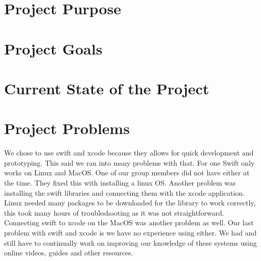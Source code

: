 \documentclass[onecolumn, draftclsnofoot,10pt, compsoc]{IEEEtran}
\def \CapstoneProjectName{ISS Barometer App }
\begin{document}
\begin{titlepage}
\begin{singlespace}
{{            }
            \vspace{20pt}
        }
        \begin{abstract}
        The International Space Station, the conglomerate work of multiple national space associations, including NASA, requires precision devices to monitor the many aspects of space life.
        One very important aspect for the success of life in near vacuum is sustained air pressure inside the modules.
        This air pressure is monitored by mechanical barometers, called Manovacometers, which must be visually monitored, and are no longer available.
        The \CapstoneProjectName seeks to provide a suitable replacement for the current barometer device aboard the International Space Station.
        This document will serve to introduce the \CapstoneProjectName, and will detail the problem, the solution, and the success metrics of the project.
        The sections include the Definition of the Problem, Definition of Project, and the Metrics of Success.
        \end{abstract}
    \end{singlespace}
\end{titlepage}
\newpage
{}
\tableofcontents
\clearpage

\section{Project Purpose}

\section{Project Goals}

\section{Current State of the Project}

\section{Project Problems}
We chose to use swift and xcode because they allows for quick development and prototyping. 
This said we ran into many problems with that. For one Swift only works on Linux and MacOS.
One of our group members did not have either at the time. They fixed this with installing a linux OS. 
Another problem was installing the swift libraries and connecting them with the xcode application.
Linux needed many packages to be downloaded for the library to work correctly, this took many hours of troubleshooting as it was not straightforward.
Connecting swift to xcode on the MacOS was another problem as well. 
Our last problem with swift and xcode is we have no experience using either.
We had and still have to continually work on improving our knowledge of these systems using online videos, guides and other resources. 
\end{document}
